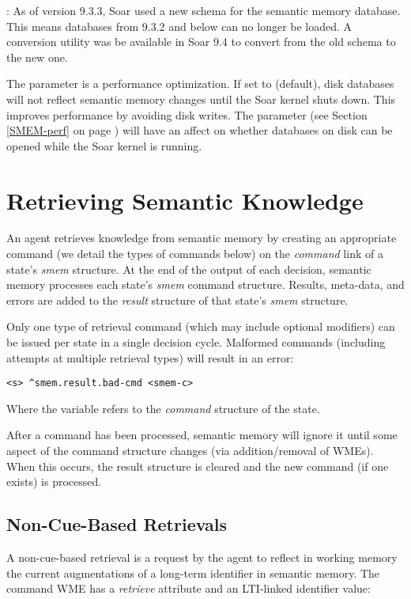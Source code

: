 : As of version 9.3.3, Soar used a new schema for the semantic memory database. This means databases from 9.3.2 and below can no longer be loaded.  A conversion utility was be available in Soar 9.4 to convert from the old schema to the new one.%

The  parameter is a performance optimization. 
If set to  (default), disk databases will not reflect semantic memory changes until the Soar kernel shuts down. 
This improves performance by avoiding disk writes. 
The  parameter (see Section \ref{SMEM-perf} on page \pageref{SMEM-perf}) will have an affect on whether databases on disk can be opened while the Soar kernel is running.


\section{Retrieving Semantic Knowledge}
\label{SMEM-retrieve}

An agent retrieves knowledge from semantic memory by creating an appropriate command (we detail the types of commands below) on the \emph{command} link of a state's \emph{smem} structure. 
At the end of the output of each decision, semantic memory processes each state's \emph{smem} command structure.  
Results, meta-data, and errors are added to the \emph{result} structure of that state's \emph{smem} structure.

Only one type of retrieval command (which may include optional modifiers) can be issued per state in a single decision cycle.  
Malformed commands (including attempts at multiple retrieval types) will result in an error:

\begin{verbatim}
<s> ^smem.result.bad-cmd <smem-c>
\end{verbatim}

Where the  variable refers to the \emph{command} structure of the state.

After a command has been processed, semantic memory will ignore it until some aspect of the command structure changes (via addition/removal of WMEs).  
When this occurs, the result structure is cleared and the new command (if one exists) is processed.

\subsection{Non-Cue-Based Retrievals}
A non-cue-based retrieval is a request by the agent to reflect in working memory the current augmentations of a long-term identifier in semantic memory. 
The command WME has a \emph{retrieve} attribute and an LTI-linked identifier value:

